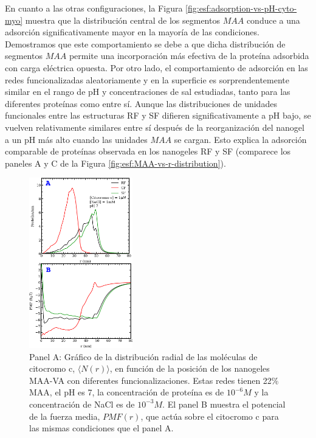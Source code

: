 En cuanto a las otras configuraciones, la Figura \ref{fig:esf:adsorption-vs-pH-cyto-myo} muestra que la distribuci\'on central de los segmentos $MAA$ conduce a una adsorci\'on significativamente mayor en la mayor\'ia de las condiciones. Demostramos que este comportamiento se debe a que dicha distribuci\'on de segmentos $MAA$ permite una incorporaci\'on m\'as efectiva de la prote\'ina adsorbida con carga el\'ectrica opuesta. Por otro lado, el comportamiento de adsorci\'on en las redes funcionalizadas aleatoriamente y en la superficie es sorprendentemente similar en el rango de pH y concentraciones de sal estudiadas, tanto para las diferentes prote\'inas como entre s\'i. Aunque las distribuciones de unidades funcionales entre las estructuras RF y SF difieren significativamente a pH bajo, se vuelven relativamente similares entre s\'i despu\'es de la reorganizaci\'on del nanogel a un pH m\'as alto cuando las unidades $MAA$ se cargan. Esto explica la adsorci\'on comparable de prote\'inas observada en los nanogeles RF y SF (comparece los paneles A y C de la Figura \ref{fig:esf:MAA-vs-r-distribution}).




\begin{figure}[!htb]
     \centering
     \includegraphics[width=0.40\textwidth]{Figures/graphs-gel2/cito-adsr-pmf.pdf}
     \caption{Panel A: Gr\'afico de la distribuci\'on radial de las mol\'eculas de citocromo c, $\langle N(r)\rangle$, en funci\'on de la posici\'on de los nanogeles MAA-VA con diferentes funcionalizaciones.
     	Estas redes tienen 22\% MAA, el pH es 7, la concentraci\'on de prote\'ina es de $10^{-6}M$ y la concentraci\'on de NaCl es de $10^{-3}M$.
     	El panel B muestra el potencial de la fuerza media, ${PMF}(r)$, que act\'ua sobre el citocromo c para las mismas condiciones que el panel A.}
     \label{fig:esf:adsorption-vs-r-cyto}
 \end{figure}



